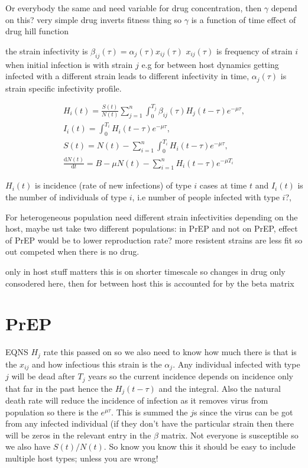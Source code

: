 \documentclass[twocolumn]{svjour3}          %
\begin{document}
Or everybody the same and need variable for drug concentration, then $\gamma$ depend on this? very simple drug inverts fitness thing so $ \gamma $ is  a function of time effect of drug hill function

the strain infectivity is
$\beta_{ij}(\tau)=\alpha_j(\tau) x_{ij}(\tau)$
$x_{ij}(\tau)$ is frequency of strain $i$ when initial infection is with strain $j$ e.g for between host dynamics getting infected with a different strain leads to different infectivity in time, $ \alpha_j(\tau)$ is strain specific infectivity profile.

\begin{gather*}
H_i(t) = \frac{S(t)}{N(t)}  \sum_{j=1}^n  \int_0^{T_j} \beta_{ij}(\tau) H_j(t-\tau)e^{-\mu \tau}, \\
I_i(t) = \int_0^{T_i}  H_i(t-\tau)e^{-\mu \tau}, \\
S(t) = N(t) - \sum_{i=1}^n  \int_0^{T_i} H_i(t-\tau)e^{-\mu \tau}, \\ 
\frac{\text{d} N(t)}{\text{d} t} = B- \mu N(t) - \sum_{i=1}^n  H_i(t-\tau)e^{-\mu T_i}
\end{gather*}


$H_i(t)$ is incidence (rate of new infections) of type $ i$ cases at time $t$
and $ I_i(t) $ is the number of individuals of type  $i$, i.e number of people infected with type  $ i$?, 

For heterogeneous  population  need  different strain infectivities  depending on the host, maybe ust take two different populations:  in PrEP and not on PrEP, effect of PrEP would be to  lower reproduction  rate? more resistent strains are less fit so  out competed when there is no drug.

only in host stuff matters this  is on shorter timescale  so changes in drug only consodered here, then for between host this is accounted for by the beta matrix


\section{PrEP}

EQNS $ H_j$ rate this passed on so we also need to know how much there is that is the $x_{ij}$ and how infectious this strain is the $\alpha_j$. Any individual infected with type $j$ will be dead after $T_j$ years so the current  incidence depends on incidence only that far in the past hence the   $ H_j(t-\tau)$ and the integral. Also the natural death rate  will reduce the incidence of infection as it removes virus from population so there is the $ e^{\mu \tau}$. This is summed the $j$s since the virus can be got from any infected individual (if they don't have the particular strain then there will be zeros in the relevant entry in the $\beta$ matrix. Not everyone is susceptible so we also  have $S(t)/N(t)$. So know you know this it should be easy to include multiple host types;  unless you are wrong!
\end{document}
